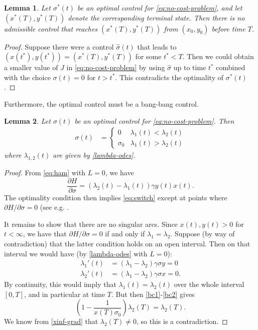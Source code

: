 \documentclass[english,12pt,letter]{article}
\newtheorem{lem}{Lemma}
\newcommand{\Rnot}{\sigma_0}
\begin{document}
\begin{lem} \label{lem:min-time}
Let $\sigma^*(t)$ be an optimal control for \eqref{eq:no-cost-problem}, and
let $(x^*(T),y^*(T))$ denote the corresponding terminal state.
Then there is no admissible control that reaches $(x^*(T),y^*(T))$ from $(x_0,y_0)$
before time $T$.
\end{lem}
\begin{proof}
Suppose there were a control $\hat{\sigma}(t)$ that leads to $(x(t^*),y(t^*)) = (x^*(T),y^*(T))$ for some $t^*<T$.  Then
we could obtain a smaller value of $J$ in \eqref{eq:no-cost-problem} by using
$\hat{\sigma}$ up to time $t^*$ combined with the choice $\sigma(t)=0$ for $t>t^*$.
This contradicts the optimality of $\sigma^*(t)$.
\end{proof}

Furthermore, the optimal control must be a bang-bang control.
\begin{lem} \label{lem:bang-bang}
Let $\sigma(t)$ be an optimal control for \eqref{eq:no-cost-problem}.
Then
\begin{align} \label{eq:switch}
    \sigma(t) & = \begin{cases} 0 & \lambda_1(t)<\lambda_2(t) \\ \sigma_0 & \lambda_1(t) > \lambda_2(t) \end{cases}
\end{align}
where $\lambda_{1,2}(t)$ are given by \eqref{lambda-odes}.
\end{lem}
\begin{proof}
From \eqref{eq:ham} with $L=0$, we have
$$
\frac{\partial H}{\partial \sigma} = (\lambda_2(t)-\lambda_1(t))\gamma y(t) x(t).
$$
The optimality condition then implies \eqref{eq:switch} except at points where $\partial H/\partial \sigma=0$
(see e.g. \cite[Ch. 17]{lenhart2007optimal}.

{\color{red}
It remains to show that there are no singular arcs.
Since $x(t),y(t) >0$ for $t<\infty$, we have that $\partial H/\partial \sigma=0$
if and only if $\lambda_1=\lambda_2$.  Suppose (by way of contradiction) that
the latter condition holds on an open interval.  Then on that interval we would
have (by \eqref{lambda-odes} with $L=0$):
\begin{align}
\lambda_1'(t) & = (\lambda_1-\lambda_2)\gamma\sigma y = 0 \\
\lambda_2'(t) & = (\lambda_1-\lambda_2)\gamma\sigma x = 0.
\end{align}
By continuity, this would imply that $\lambda_1(t)=\lambda_2(t)$ over
the whole interval $[0,T]$, and in particular at time $T$.
But then \eqref{bc1}-\eqref{bc2} gives
$$
\left(1-\frac{1}{x(T)\Rnot}\right)\lambda_2(T) = \lambda_2(T).
$$
We know from \eqref{xinf-grad} that $\lambda_2(T)\ne 0$, so this
is a contradiction.}
\end{proof}
\end{document}
